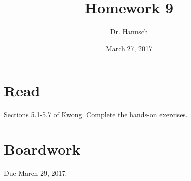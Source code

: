 \documentclass[12pt]{article}
\title{Homework 9}
\author{Dr. Hanusch}  %
\date{March 27, 2017}
\begin{document}
\newtheorem{thm}{Theorem}[section]
\newtheorem{cor}[thm]{Corollary}
\newtheorem{lem}[thm]{Lemma}
\newtheorem{prop}[thm]{Proposition}
\theoremstyle{definition}
\newtheorem{defn}[thm]{Definition}
\newtheorem{qu}[]{Question}
\theoremstyle{remark}
\newtheorem{rem}[thm]{Remark}
\newtheorem*{prf}{Proof}

\newcommand{\norm}[1]{\left\Vert#1\right\Vert}
\newcommand{\abs}[1]{\left\vert#1\right\vert}
\newcommand{\set}[1]{\left\{#1\right\}}
\newcommand{\Real}{\mathbb R}
\newcommand{\Zee}{\mathbb Z}
\newcommand{\eps}{\varepsilon}
\newcommand{\To}{\longrightarrow}
\newcommand{\BX}{\mathbf{B}(X)}
\newcommand{\A}{\mathcal{A}}
\newcommand{\U}{\mathcal{U}}
\newcommand{\power}{\mathscr{P}}
\newcommand{\dv}{\textrm{ div }}




\maketitle

\section{Read}

Sections 5.1-5.7 of Kwong. Complete the hands-on exercises.

\section{Boardwork} 

Due March 29, 2017.

\end{document}
